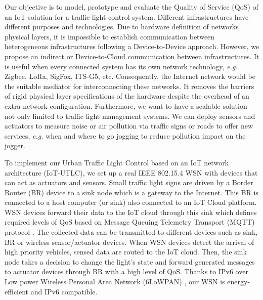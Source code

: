 \documentclass[conference]{../../setup/IEEEtran}
\begin{document}
Our objective is to model, prototype and evaluate the Quality of Service (QoS) of an IoT solution for a traffic light control system. Different infrastructures have different purposes and technologies. Due to hardware definition of networks physical layers, it is impossible  to establish communication between heterogeneous infrastructures following a Device-to-Device approach. However, we propose an indirect or Device-to-Cloud communication between infrastructures. It is useful when every connected system has its own network technology, \textit{e.g.} Zigbee, LoRa, SigFox, ITS-G5, etc. 
Consequently, the Internet network would be the suitable mediator for interconnecting these networks.
It removes the barriers of rigid physical layer specifications of the hardware despite the overhead of an extra network configuration. Furthermore, we want to have a scalable solution not only limited to traffic light management systems. We can deploy sensors and actuators to measure noise or air pollution via traffic signs or roads to offer new services, \textit{e.g.} when and where to go jogging to reduce pollution impact on the jogger.

To implement our Urban Traffic Light Control based on an IoT network architecture (IoT-UTLC),
	we set up a real IEEE 802.15.4 WSN with devices that can act as actuators and sensors.
Small traffic light signs are driven by a Border Router (BR) device  to a sink node which is a gateway to the Internet.
This BR is connected to a host computer (or sink) also connected to an IoT Cloud platform.
WSN devices forward their data to the IoT cloud through this sink which defines required levels of QoS based on Message Queuing Telemetry Transport (MQTT) protocol \cite{Al-Fuqaha2015}. The collected data can be transmitted to different devices such as sink, BR or wireless sensor/actuator devices.
When WSN devices detect the arrival of high priority vehicles, sensed data are routed to the IoT cloud.
Then, the sink node takes a decision to change the light's state and forward generated messages to actuator devices through BR with a high level of QoS.
Thanks to IPv6 over Low power Wireless Personal Area Network (6LoWPAN) \cite{chalappuram_development_2016},
	our WSN is energy-efficient and IPv6 compatible.

\end{document}

